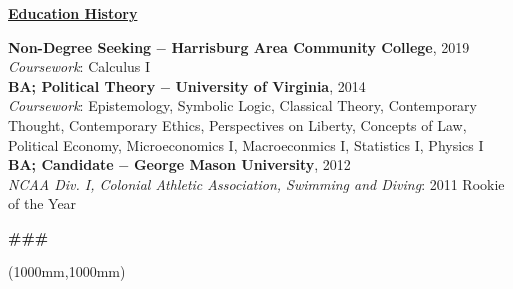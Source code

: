 \documentclass[8pt]{article}
\begin{document}
\begin{center}
	\textbf{\underline{\Large{Education History}}}
\end{center}
\textbf{Non-Degree Seeking} $-$ \textbf{Harrisburg Area Community College}, 2019\\
\textit{Coursework}: Calculus I\\

\textbf{BA; Political Theory} $-$ \textbf{University of Virginia}, 2014  \\
\textit{Coursework}: Epistemology, Symbolic Logic, Classical Theory, Contemporary Thought, Contemporary Ethics, Perspectives on Liberty, Concepts of Law, Political Economy, Microeconomics I, Macroeconmics I, Statistics I, Physics I \\

\textbf{BA; Candidate} $-$ \textbf{George Mason University}, 2012  \\
\textit{NCAA Div. I, Colonial Athletic Association, Swimming and Diving}: 2011 Rookie of the Year\\

\vspace{10pt}
\begin{center}
	\textbf{\Large{\#\#\#}} \\
\end{center}

\thispagestyle{empty}
\begin{textblock*}{300mm}(1000mm,1000mm)
\end{textblock*}
\end{document}
